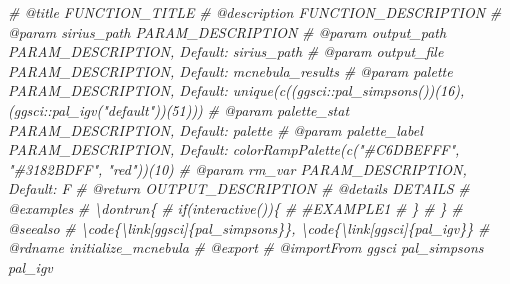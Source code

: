 \documentclass[
]{article}
\newenvironment{Shaded}{\begin{snugshade}}{\end{snugshade}}
\newcommand{\CommentTok}[1]{\textcolor[rgb]{0.56,0.35,0.01}{\textit{#1}}}
\begin{document}
\begin{Shaded}
\begin{Highlighting}[]
\CommentTok{\#\textquotesingle{} @title FUNCTION\_TITLE}
\CommentTok{\#\textquotesingle{} @description FUNCTION\_DESCRIPTION}
\CommentTok{\#\textquotesingle{} @param sirius\_path PARAM\_DESCRIPTION}
\CommentTok{\#\textquotesingle{} @param output\_path PARAM\_DESCRIPTION, Default: sirius\_path}
\CommentTok{\#\textquotesingle{} @param output\_file PARAM\_DESCRIPTION, Default: \textquotesingle{}mcnebula\_results\textquotesingle{}}
\CommentTok{\#\textquotesingle{} @param palette PARAM\_DESCRIPTION, Default: unique(c((ggsci::pal\_simpsons())(16), (ggsci::pal\_igv("default"))(51)))}
\CommentTok{\#\textquotesingle{} @param palette\_stat PARAM\_DESCRIPTION, Default: palette}
\CommentTok{\#\textquotesingle{} @param palette\_label PARAM\_DESCRIPTION, Default: colorRampPalette(c("\#C6DBEFFF", "\#3182BDFF", "red"))(10)}
\CommentTok{\#\textquotesingle{} @param rm\_var PARAM\_DESCRIPTION, Default: F}
\CommentTok{\#\textquotesingle{} @return OUTPUT\_DESCRIPTION}
\CommentTok{\#\textquotesingle{} @details DETAILS}
\CommentTok{\#\textquotesingle{} @examples }
\CommentTok{\#\textquotesingle{} \textbackslash{}dontrun\{}
\CommentTok{\#\textquotesingle{} if(interactive())\{}
\CommentTok{\#\textquotesingle{}  \#EXAMPLE1}
\CommentTok{\#\textquotesingle{}  \}}
\CommentTok{\#\textquotesingle{} \}}
\CommentTok{\#\textquotesingle{} @seealso }
\CommentTok{\#\textquotesingle{}  \textbackslash{}code\{\textbackslash{}link[ggsci]\{pal\_simpsons\}\}, \textbackslash{}code\{\textbackslash{}link[ggsci]\{pal\_igv\}\}}
\CommentTok{\#\textquotesingle{} @rdname initialize\_mcnebula}
\CommentTok{\#\textquotesingle{} @export }
\CommentTok{\#\textquotesingle{} @importFrom ggsci pal\_simpsons pal\_igv}


\end{Highlighting}
\end{Shaded}
\end{document}
